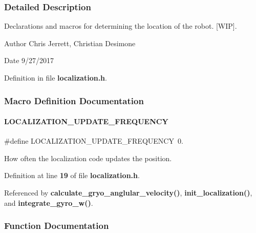 \subsubsection{Detailed Description}
Declarations and macros for determining the location of the robot. [W\+IP]. 

\begin{DoxyAuthor}{Author}
Chris Jerrett, Christian Desimone 
\end{DoxyAuthor}
\begin{DoxyDate}{Date}
9/27/2017 
\end{DoxyDate}


Definition in file \textbf{ localization.\+h}.



\subsubsection{Macro Definition Documentation}
\mbox{\label{localization_8h_a4fa0a97f6aafe983a46ffc7188d1fab5}} 
\paragraph{L\+O\+C\+A\+L\+I\+Z\+A\+T\+I\+O\+N\+\_\+\+U\+P\+D\+A\+T\+E\+\_\+\+F\+R\+E\+Q\+U\+E\+N\+CY}
{\footnotesize\ttfamily \#define L\+O\+C\+A\+L\+I\+Z\+A\+T\+I\+O\+N\+\_\+\+U\+P\+D\+A\+T\+E\+\_\+\+F\+R\+E\+Q\+U\+E\+N\+CY~0.}

How often the localization code updates the position. 

Definition at line \textbf{ 19} of file \textbf{ localization.\+h}.



Referenced by \textbf{ calculate\+\_\+gryo\+\_\+anglular\+\_\+velocity()}, \textbf{ init\+\_\+localization()}, and \textbf{ integrate\+\_\+gyro\+\_\+w()}.



\subsubsection{Function Documentation}
\mbox{\label{localization_8h_a5dd17937f5561711cd12cdefa8d31869}} 
